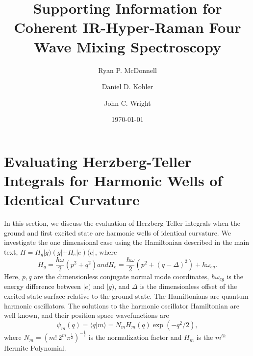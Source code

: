 \documentclass[aip, jcp, reprint, onecolumn, nofootinbib]{revtex4-2}
\begin{document}
\title{Supporting Information for Coherent IR-Hyper-Raman Four Wave Mixing Spectroscopy}


\author{Ryan P. McDonnell} 
\author{Daniel D. Kohler}
\author{John C. Wright} 


\date{\today}

\maketitle
\tableofcontents
\clearpage


\section{Evaluating Herzberg-Teller Integrals for Harmonic Wells of Identical Curvature}

In this section, we discuss the evaluation of Herzberg-Teller integrals when the ground and first excited state are harmonic wells of identical curvature.\cite{HerzbergTeller1933}
We investigate the one dimensional case using the Hamiltonian described in the main text, $H = H_g |g) \left(g| + H_e |e\right) (e|$, where
\begin{subequations}\label{Hamiltonian}
	\begin{equation}
		H_g = \frac{\hbar \omega }{2} \left(p^2 + q^2 \right)
	\end{equation}
	and
	\begin{equation}
		H_e = \frac{\hbar \omega }{2} \left(p^2 +  (q-\Delta)^2 \right) + \hbar \omega_{eg}.
	\end{equation} 
\end{subequations}
Here, $p,q$ are the dimensionless conjugate normal mode coordinates, $\hbar\omega_{eg}$ is the energy difference between $|e)$ and $|g)$, and $\Delta$ is the dimensionless offset of the excited state surface relative to the ground state.
The Hamiltonians are quantum harmonic oscillators.
The solutions to the harmonic oscillator Hamiltonian are well known, and their position space wavefunctions are
\begin{equation}
	\psi_m(q) = \langle q | m \rangle = N_m H_m(q) \exp(-q^2/2),
\end{equation}
where $N_m = (m! \ 2^m \pi^{\frac{1}{2}})^{-\frac{1}{2}}$ is the normalization factor and $H_m$ is the $m^{th}$ Hermite Polynomial.\cite{RN230, MorseFeshbach}
\end{document}
